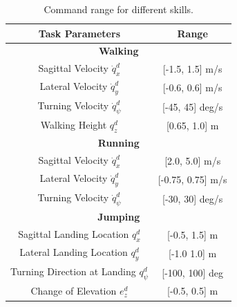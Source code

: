 \begin{table}[!ht]
\centering
\scriptsize
\caption{Command range for different skills.}
\label{tab:command}
\begin{tabular}{|cc|}
\hline
\multicolumn{1}{|c|}{\textbf{Task Parameters}}          & \textbf{Range}        \\ \hline
\multicolumn{2}{|c|}{\textbf{Walking}}                                          \\ \hline
\multicolumn{1}{|c|}{Sagittal Velocity $\dot{q}^d_x$}   & {[}-1.5, 1.5{]} m/s   \\ \hline
\multicolumn{1}{|c|}{Lateral Velocity $\dot{q}^d_y$}    & {[}-0.6, 0.6{]} m/s   \\ \hline
\multicolumn{1}{|c|}{Turning Velocity $\dot{q}^d_\psi$} & {[}-45, 45{]} deg/s   \\ \hline
\multicolumn{1}{|c|}{Walking Height $q^d_z$}            & {[}0.65, 1.0{]} m     \\ \hline
\multicolumn{2}{|c|}{\textbf{Running}}                                          \\ \hline
\multicolumn{1}{|c|}{Sagittal Velocity $\dot{q}^d_x$}   & {[}2.0, 5.0{]} m/s    \\ \hline
\multicolumn{1}{|c|}{Lateral Velocity $\dot{q}^d_y$}    & {[}-0.75, 0.75{]} m/s \\ \hline
\multicolumn{1}{|c|}{Turning Velocity $\dot{q}^d_\psi$} & {[}-30, 30{]} deg/s   \\ \hline
\multicolumn{2}{|c|}{\textbf{Jumping}}                                          \\ \hline
\multicolumn{1}{|c|}{Sagittal Landing Location $q^d_x$} & {[}-0.5, 1.5{]} m     \\ \hline
\multicolumn{1}{|c|}{Lateral Landing Location $q^d_y$}  & {[}-1.0 1.0{]} m      \\ \hline
\multicolumn{1}{|c|}{Turning Direction at Landing $q^d_\psi$} & {[}-100, 100{]} deg \\ \hline
\multicolumn{1}{|c|}{Change of Elevation $e^d_z$}       & {[}-0.5, 0.5{]} m     \\ \hline
\end{tabular}
\end{table}